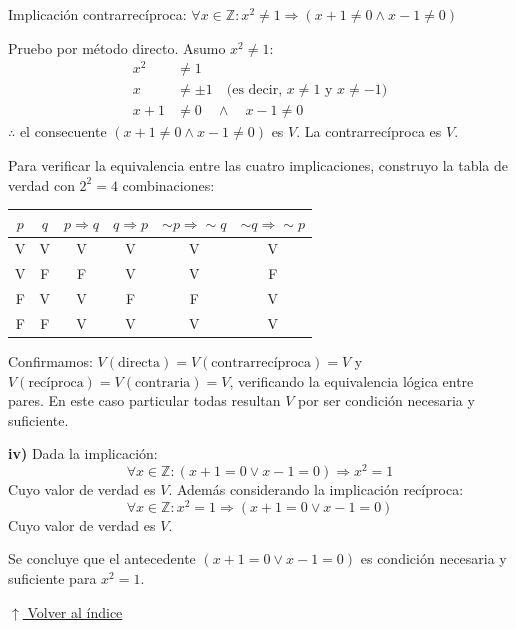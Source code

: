 \documentclass[12pt]{article}
\newcommand{\volverindice}{%
    \vspace{1em}%
    \begin{flushright}%
        \hyperlink{indice}{\small $\uparrow$ Volver al índice}%
    \end{flushright}%
}
\begin{document}
\begin{enumerate}[label=\alph*.-]
    Implicación contrarrecíproca: $\forall x \in \mathbb{Z}: x^2 \neq 1 \Rightarrow (x+1\neq 0 \wedge x-1\neq 0)$

    Pruebo por método directo. Asumo $x^2 \neq 1$:
    \begin{align*}
        x^2 &\neq 1 \\
        x &\neq \pm 1 \quad \text{(es decir, } x \neq 1 \text{ y } x \neq -1\text{)}\\
        x + 1 &\neq 0 \quad \wedge \quad x - 1 \neq 0
    \end{align*}
    $\therefore$ el consecuente $(x+1\neq 0 \wedge x-1\neq 0)$ es $V$. La contrarrecíproca es $V$.

    Para verificar la equivalencia entre las cuatro implicaciones, construyo la tabla de verdad con $2^2 = 4$ combinaciones:

    \begin{center}
    \begin{tabular}{cc|c|c|c|c}
        \toprule
        $p$ & $q$ & $p \Rightarrow q$ & $q \Rightarrow p$ & $\sim p \Rightarrow \sim q$ & $\sim q \Rightarrow \sim p$ \\
        \midrule
        V & V & V & V & V & V \\
        V & F & F & V & V & F \\
        F & V & V & F & F & V \\
        F & F & V & V & V & V \\
        \bottomrule
    \end{tabular}
    \end{center}

    Confirmamos: $V(\text{directa}) = V(\text{contrarrecíproca}) = V$ y $V(\text{recíproca}) = V(\text{contraria}) = V$, verificando la equivalencia lógica entre pares. En este caso particular todas resultan $V$ por ser condición necesaria y suficiente.

    \textbf{iv)} Dada la implicación:
    \[\forall x \in \mathbb{Z}: (x+1=0 \vee x-1=0) \Rightarrow x^2=1\]
    Cuyo valor de verdad es $V$. Además considerando la implicación recíproca:
    \[\forall x \in \mathbb{Z}: x^2=1 \Rightarrow (x+1=0 \vee x-1=0)\]
    Cuyo valor de verdad es $V$.

    Se concluye que el antecedente $(x+1=0 \vee x-1=0)$ es condición necesaria y suficiente para $x^2=1$.

\end{enumerate}

\volverindice
\newpage
\end{document}
